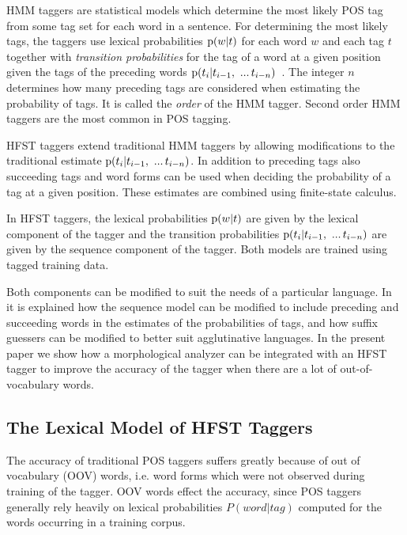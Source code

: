 \documentclass{llncs}
\begin{document}
HMM taggers are statistical models which determine the most likely
POS tag from some tag set for each word in a sentence. For
determining the most likely tags, the taggers use
lexical probabilities ${\rm p}(w|t)$ for each word $w$ and each tag
$t$ together with \emph{transition probabilities} for the tag of a
word at a given position given the tags of the preceding words ${\rm
  p}(t_i | t_{i - 1},\ ...\, t_{i-n})$~\cite{silfverberg/2011/nodalida}. The integer $n$ determines how
many preceding tags are considered when estimating the probability of
tags. It is called the \emph{order} of the HMM tagger. Second order HMM
taggers are the most common in POS tagging.

HFST taggers extend traditional HMM taggers by allowing modifications
to the traditional estimate ${\rm p}(t_i | t_{i - 1},\ ...\,
t_{i-n})$. In addition to preceding tags also succeeding tags and word
forms can be used when deciding the probability of a tag at a given
position. These estimates are combined using finite-state calculus.

In HFST taggers, the lexical probabilities ${\rm p}(w|t)$ are given by
the lexical component of the tagger and the transition probabilities
${\rm p}(t_i | t_{i - 1},\ ...\, t_{i-n})$ are given by the sequence
component of the tagger. Both models are trained using tagged
training data.

Both components can be modified to suit the needs of a particular
language. In~\cite{silfverberg/2011/nodalida} it is explained how the sequence
model can be modified to include preceding and succeeding words in
the estimates of the probabilities of tags, and how suffix guessers
can be modified to better suit agglutinative languages. In the present paper
we show how a morphological analyzer can be integrated with an HFST
tagger to improve the accuracy of the tagger when there are a lot of
out-of-vocabulary words.


\subsection{The Lexical Model of HFST Taggers}

The accuracy of traditional POS taggers suffers greatly because of out
of vocabulary (OOV) words, i.e. word forms which were not observed
during training of the tagger. OOV words effect the accuracy, since
POS taggers generally rely heavily on lexical probabilities
$P(word|tag)$ computed for the words occurring in a training corpus.
\end{document}

